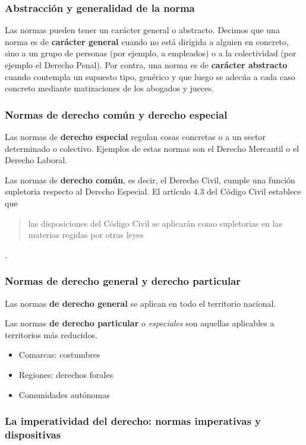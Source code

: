 \documentclass[a4paper,12pt]{report}
\begin{document}
\subsubsection{Abstracción y generalidad de la norma}

Las normas pueden tener un carácter general o abstracto. Decimos que una norma
es de \textbf{carácter general} cuando no está dirigida a alguien en concreto, sino a un
grupo de personas (por ejemplo, a empleados) o a la colectividad (por ejemplo el
Derecho Penal). Por contra, una norma es de \textbf{carácter abstracto} cuando
contempla un supuesto tipo, genérico y que luego se adecúa a cada caso concreto
mediante matizaciones de los abogados y jueces.

\subsubsection{Normas de derecho común y derecho especial}

Las normas de \textbf{derecho especial} regulan cosas concretas o a un sector
determinado o colectivo. Ejemplos de estas normas son el Derecho Mercantil o el
Derecho Laboral.

Las normas de \textbf{derecho común}, es decir, el Derecho Civil, cumple una
función supletoria respecto al Derecho Especial. El artículo 4.3 del Código
Civil establece que \begin{quote}las disposiciones del Código Civil se aplicarán
como supletorias en las materias regidas por otras leyes\end{quote}.

\subsubsection{Normas de derecho general y derecho particular}

Las normas \textbf{de derecho general} se aplican en todo el territorio
nacional.

Las normas \textbf{de derecho particular} o \textit{especiales} son aquellas aplicables a territorios
más reducidos.

\begin{itemize}
\item{Comarcas: costumbres}
\item{Regiones: derechos forales}
\item{Comunidades autónomas}
\end{itemize}

\subsubsection{La imperatividad del derecho: normas imperativas y dispositivas}
\end{document}
